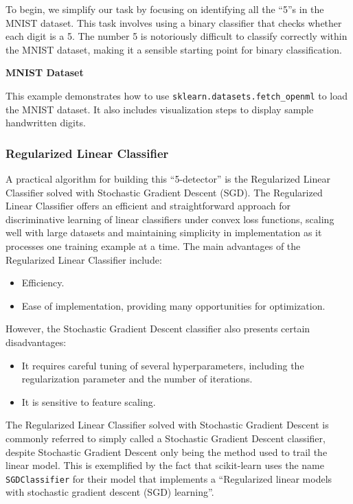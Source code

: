 \documentclass[12pt,letter]{article}
\begin{document}
To begin, we simplify our task by focusing on identifying all the ``5''s in the MNIST dataset. This task involves using a binary classifier that checks whether each digit is a 5. The number 5 is notoriously difficult to classify correctly within the MNIST dataset, making it a sensible starting point for binary classification.


\begin{example}
\textbf{MNIST Dataset}

\noindent This example demonstrates how to use \texttt{sklearn.datasets.fetch\_openml} to load the MNIST dataset. It also includes  visualization steps to display sample handwritten digits.
\end{example}



\subsubsection{Regularized Linear Classifier}

A practical algorithm for building this ``5-detector'' is the Regularized Linear Classifier solved with Stochastic Gradient Descent (SGD). The Regularized Linear Classifier offers an efficient and straightforward approach for discriminative learning of linear classifiers under convex loss functions, scaling well with large datasets and maintaining simplicity in implementation as it processes one training example at a time. The main advantages of the Regularized Linear Classifier include:
\begin{itemize}
\item Efficiency.
\item Ease of implementation, providing many opportunities for optimization.
\end{itemize}
However, the Stochastic Gradient Descent classifier also presents certain disadvantages:
\begin{itemize}
\item It requires careful tuning of several hyperparameters, including the regularization parameter and the number of iterations.
\item It is sensitive to feature scaling.
\end{itemize}

\begin{mdframed}[middlelinewidth=0.5mm]
\begin{center}
\end{center}
The Regularized Linear Classifier solved with Stochastic Gradient Descent is commonly referred to simply called a Stochastic Gradient Descent classifier, despite Stochastic Gradient Descent only being the method used to trail the linear model. This is exemplified by the fact that scikit-learn uses the name \texttt{SGDClassifier} for their model that implements a ``Regularized linear models with stochastic gradient descent (SGD) learning''. 
\end{mdframed}
\end{document}
